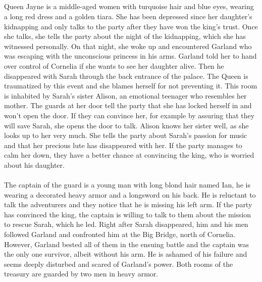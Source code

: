 %
\\\\
%
\\\\
%
 Queen Jayne is a middle-aged women with turquoise hair and blue eyes, wearing a long red dress and a golden tiara.
She has been depressed since her daughter's kidnapping and only talks to the party after they have won the king's trust.
Once she talks, she tells the party about the night of the kidnapping, which she has witnessed personally.
On that night, she woke up and encountered Garland who was escaping with the unconscious princess in his arms.
Garland told her to hand over control of Cornelia if she wants to see her daughter alive.
Then he disappeared with Sarah through the back entrance of the palace.
The Queen is traumatized by this event and she blames herself for not preventing it.
%
\ofpar
%
 This room is inhabited by Sarah's sister Alison, an emotional teenager who resembles her mother.
The guards at her door tell the party that she has locked herself in and won't open the door.
If they can convince her, for example by assuring that they will save Sarah, she opens the door to talk.
Alison knows her sister well, as she looks up to her very much.
She tells the party about Sarah's passion for music and that her precious lute has disappeared with her.
If the party manages to calm her down, they have a better chance at convincing the king, who is worried about his daughter.
%
\ofpar
%
\\\\
%
 The captain of the guard is a young man with long blond hair named Ian, he is wearing a decorated heavy armor and a longsword on his back.
He is reluctant to talk the adventurers and they notice that he is missing his left arm. 
If the party has convinced the king, the captain is willing to talk to them about the mission to rescue Sarah, which he led.
Right after Sarah disappeared, him and his men followed Garland and confronted him at the Big Bridge, north of Cornelia.
However, Garland bested all of them in the ensuing battle and the captain was the only one survivor, albeit without his arm.
He is ashamed of his failure and seems deeply disturbed and scared of Garland's power.
%
\ofpar
%
Both rooms of the treasury are guarded by two men in heavy armor.
